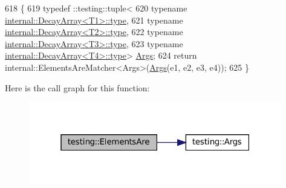 \begin{DoxyCode}
618                                                                     \{
619   typedef ::testing::tuple<
620       \textcolor{keyword}{typename} \hyperlink{namespacegenerate__debs_a50bc9a7ecac9584553e089a448bcde58}{internal::DecayArray<T1>::type},
621       \textcolor{keyword}{typename} \hyperlink{namespacegenerate__debs_a50bc9a7ecac9584553e089a448bcde58}{internal::DecayArray<T2>::type},
622       \textcolor{keyword}{typename} \hyperlink{namespacegenerate__debs_a50bc9a7ecac9584553e089a448bcde58}{internal::DecayArray<T3>::type},
623       \textcolor{keyword}{typename} \hyperlink{namespacegenerate__debs_a50bc9a7ecac9584553e089a448bcde58}{internal::DecayArray<T4>::type}> 
      \hyperlink{namespacetesting_a09ac462e8d6ed468cbfaa9c767aee0aa}{Args};
624   \textcolor{keywordflow}{return} internal::ElementsAreMatcher<Args>(\hyperlink{namespacetesting_a09ac462e8d6ed468cbfaa9c767aee0aa}{Args}(e1, e2, e3, e4));
625 \}
\end{DoxyCode}
Here is the call graph for this function\+:
\nopagebreak
\begin{figure}[H]
\begin{center}
\leavevmode
\includegraphics[width=313pt]{namespacetesting_a4109ce480e0145bfce7c46120afb36d3_cgraph}
\end{center}
\end{figure}
\mbox{\label{namespacetesting_aa075d52e84310659ca8636c6e7d5c9b2}} 
